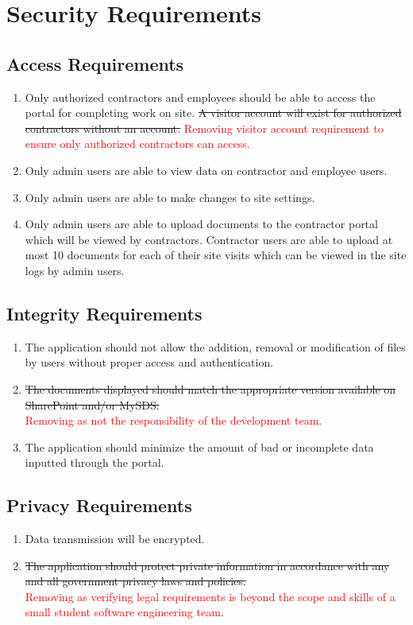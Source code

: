 \documentclass[12pt]{article}
\begin{document}
\section{Security Requirements}
\subsection{Access Requirements}
\begin{enumerate} [{SR-AR}1.]
  \item Only authorized contractors and employees should be able to access the
    portal for completing work on site. \sout{A visitor account will
    exist for authorized contractors without an account.}
    \textcolor{red}{Removing visitor account requirement to ensure
    only authorized contractors can access.}
  \item Only admin users are able to view data on contractor and employee users.
  \item Only admin users are able to make changes to site settings.
  \item Only admin users are able to upload documents to the
    contractor portal which will be viewed by contractors. Contractor users
    are able to upload at most 10 documents for each of their site
    visits which can be viewed in the site logs by admin users.
\end{enumerate}
\subsection{Integrity Requirements}
\begin{enumerate} [{SR-IR}1.]
  \item The application should not allow the addition, removal or modification
    of files by users without proper access and authentication.
  \item \sout{The documents displayed should match the appropriate
      version available
    on SharePoint and/or MySDS.}\\
    \textcolor{red}{Removing as not the responsibility of the development team}.
  \item The application should minimize the amount of bad or incomplete data
    inputted through the portal.
\end{enumerate}
\subsection{Privacy Requirements}
\begin{enumerate} [{SR-PR}1.]
  \item Data transmission will be encrypted.
  \item \sout{The application should protect private information in
      accordance with
    any and all government privacy laws and policies.}\\
    \textcolor{red}{Removing as verifying legal requirements is
    beyond the scope and skills of a small student software engineering team}.
\end{enumerate}
\end{document}
